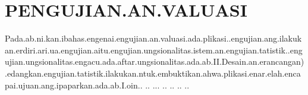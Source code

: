 	\chapter{PENGUJIAN.AN.VALUASI}

	Pada.ab.ni.kan.ibahas.engenai.engujian.an.valuasi.ada.plikasi..engujian.ang.ilakukan.erdiri.ari.ua.engujian.aitu.engujian.ungsionalitas.istem.an.engujian.tatistik..engujian.ungsionalitas.engacu.ada.aftar.ungsionalitas.ada.ab.II.Desain.an.erancangan).edangkan.engujian.tatistik.ilakukan.ntuk.embuktikan.ahwa.plikasi.enar.elah.encapai.ujuan.ang.ipaparkan.ada.ab.I.oin..
..
...
..
..
..
..
